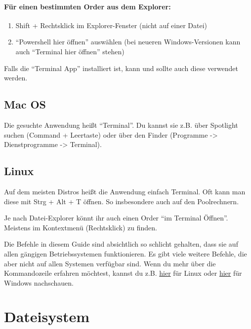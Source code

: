 \paragraph{Für einen bestimmten Order aus dem Explorer:}\mbox{}
\begin{enumerate}
    \item Shift + Rechtsklick im Explorer-Fenster (nicht auf einer Datei)
    \item \enquote{Powershell hier öffnen} auswählen (bei neueren Windows-Versionen kann auch \enquote{Terminal hier öffnen} stehen)
\end{enumerate}
\begin{hinweis}
    Falls die \enquote{Terminal App} installiert ist, kann und sollte auch diese verwendet werden.
\end{hinweis}

\subsection{Mac OS}
Die gesuchte Anwendung heißt \enquote{Terminal}. Du kannst sie z.B. über Spotlight suchen (Command + Leertaste) oder über den Finder (Programme -> Dienstprogramme -> Terminal).

\subsection{Linux}
Auf dem meisten Distros heißt die Anwendung einfach Terminal.
Oft kann man diese mit Strg + Alt + T  öffnen.
So insbesondere auch auf den Poolrechnern.

Je nach Datei-Explorer könnt ihr auch einen Order \enquote{im Terminal Öffnen}. Meistens im Kontextmenü (Rechtsklick) zu finden.

Die Befehle in diesem Guide sind absichtlich so schlicht gehalten, dass sie auf allen gängigen Betriebssystemen funktionieren. Es gibt viele weitere Befehle, die aber nicht auf allen Systemen verfügbar sind. Wenn du mehr über die Kommandozeile erfahren möchtest, kannst du z.B. \href{https://wiki.ubuntuusers.de/Shell/Befehlsübersicht/}{hier} für Linux oder \href{https://ss64.com/ps/}{hier} für Windows nachschauen.

\section{Dateisystem}
